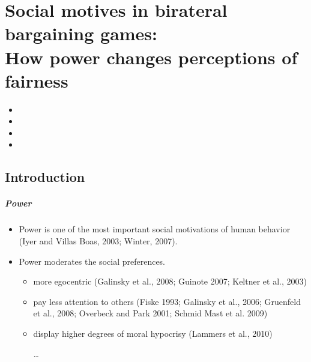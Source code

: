 \documentclass[../root]{subfiles}
\begin{document}
    \chapter{Social motives in birateral bargaining games: \\ How power changes perceptions of fairness}

    \begin{shortsummary}
        \begin{itemize}
            \item {}
            \item {}
            \item {}
            \item {}
        \end{itemize}
    \end{shortsummary}

    \section{Introduction}

    \paragraph{Power}

    \begin{itemize}
      \item Power is one of the most important social motivations of human behavior (Iyer and Villas Boas, 2003; Winter, 2007).
      \item Power moderates the social preferences.
      \begin{itemize}
        \item more egocentric (Galinsky et al., 2008; Guinote 2007; Keltner et al., 2003)
        \item pay less attention to others (Fiske 1993; Galinsky et al., 2006; Gruenfeld et al., 2008; Overbeck and Park 2001; Schmid Mast et al. 2009)
        \item display higher degrees of moral hypocrisy (Lammers et al., 2010)

        \ldots
      \end{itemize}
    \end{itemize}
\end{document}
